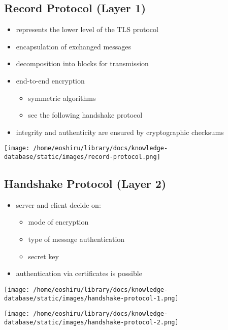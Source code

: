 \documentclass[11pt]{article}
\begin{document}
\subsection{Record Protocol (Layer 1)}
\label{sec:orgf3abffb}
\begin{itemize}
\item represents the lower level of the TLS protocol
\item encapsulation of exchanged messages
\item decomposition into blocks for transmission
\item end-to-end encryption
\begin{itemize}
\item symmetric algorithms
\item see the following handshake protocol
\end{itemize}
\item integrity and authenticity are ensured by cryptographic checksums
\end{itemize}

\begin{center}
\texttt{[image: /home/eoshiru/library/docs/knowledge-database/static/images/record-protocol.png]}
\end{center}

\subsection{Handshake Protocol (Layer 2)}
\label{sec:org04342a3}
\begin{itemize}
\item server and client decide on:
\begin{itemize}
\item mode of encryption
\item type of message authentication
\item secret key
\end{itemize}
\item authentication via certificates is possible
\end{itemize}

\begin{center}
\texttt{[image: /home/eoshiru/library/docs/knowledge-database/static/images/handshake-protocol-1.png]}
\end{center}
\begin{center}
\texttt{[image: /home/eoshiru/library/docs/knowledge-database/static/images/handshake-protocol-2.png]}
\end{center}
\end{document}
